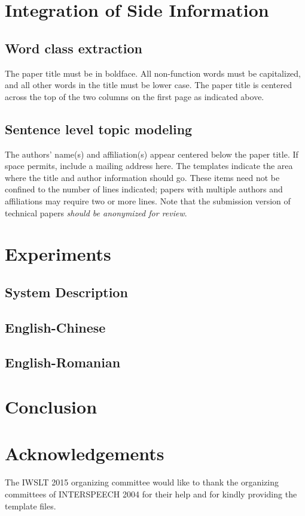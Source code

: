 \documentclass[a4paper]{article}
\begin{document}
\section{Integration of Side Information}

\subsection{Word class extraction}
The paper title must be in boldface. All non-function words must be capitalized,
and all other words in the title must be lower case. The paper title is centered
across the top of the two columns on the first page as indicated above.

\subsection{Sentence level topic modeling}
The authors' name(s) and affiliation(s) appear centered below the paper
title. If space permits, include a mailing address here. The templates indicate
the area where the title and author information should go. These items need not
be confined to the number of lines indicated; papers with multiple
authors and affiliations may require two or more lines. 
Note that the submission version of technical papers \emph{should be 
anonymized for review}. 



\section{Experiments}
\subsection{System Description}
\subsection{English-Chinese}
\subsection{English-Romanian}
\section{Conclusion}
\section{Acknowledgements}
The IWSLT 2015 organizing committee would like to thank the
organizing committees of INTERSPEECH 2004 for their
help and for kindly providing the template files.
\end{document}
